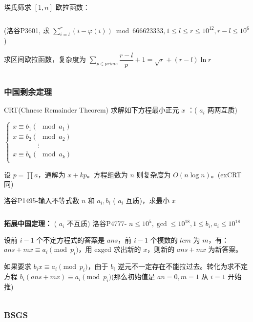 \documentclass[twocolumn,10pt]{ctexart}
\begin{document}
埃氏筛求 $[1,n]$ 欧拉函数：

\inputminted{cpp}{code/ext_007.cpp}

(洛谷P3601, 求 $\sum_{i=l}^r(i-\varphi(i))\bmod666623333,\allowbreak{}1\le l\le r\le10^{12},\allowbreak{}r-l\le10^6$ )

求区间欧拉函数，复杂度为 $\sum_{p\in prime}\dfrac{r-l}p+1=\sqrt r+(r-l)\ln r$

\inputminted{cpp}{code/p3601_euler_function.cpp}

\subsubsection{中国剩余定理}

CRT(Chnese Remainder Theorem) 求解如下方程最小正元 $x$ ：( $a_i$ 两两互质)

\begin{adjustbox}{max width=\linewidth,center}
$\begin{cases}
x\equiv b_1(\mod a_1)\\
x\equiv b_2(\mod a_2)\\
\quad\quad\quad\ \ \ \vdots\\
x\equiv b_k(\mod a_k)\\
\end{cases}$
\end{adjustbox}

设 $p=\prod a$，通解为 $x+kp$。方程组数为 $n$ 则复杂度为 $O(n\log n)$。(exCRT 同)

\begin{notebox}
洛谷P1495-输入不等式数 $n$ 和 $a_i,b_i$ ( $a_i$ 互质)，求最小 $x$
\end{notebox}

\inputminted{cpp}{code/p1495_CRT.cpp}

\textbf{拓展中国定理：} ( $a_i$ 不互质) 洛谷P4777- $n\le10^5,\allowbreak{}\gcd\le10^{18},\allowbreak{}1\le b_i,\allowbreak{}a_i\le10^{18}$

设前 $i-1$ 个不定方程式的答案是 $ans$，前 $i-1$ 个模数的 $lcm$ 为 $m$，有：$ans+mx\equiv a_i\pmod{p_i}$，用 exgcd 求出新的 $x$，则新的 $ans+mx$ 为新答案。

如果要求 $b_i x\equiv a_i\pmod{p_i}$，由于 $b_i$ 逆元不一定存在不能拉过去。转化为求不定方程 $b_i(ans+mx)\equiv a_i\pmod{p_i}$(那么初始值是 $an=0,m=1$ 从 $i=1$ 开始推)

\inputminted{cpp}{code/ext_008.cpp}

\subsubsection{BSGS}
\end{document}
